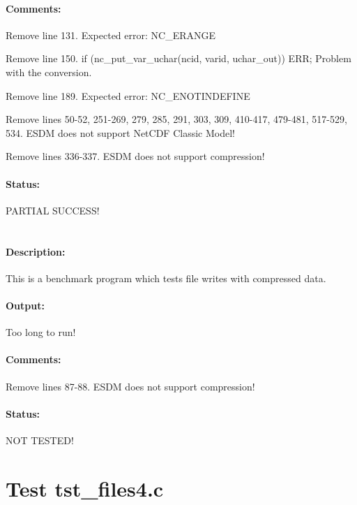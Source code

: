 \paragraph{Comments:} Remove line 131. Expected error: NC\_ERANGE

Remove line 150. if (nc\_put\_var\_uchar(ncid, varid, uchar\_out)) ERR; Problem with the conversion.

Remove line 189. Expected error: NC\_ENOTINDEFINE

Remove lines 50-52, 251-269, 279, 285, 291, 303, 309, 410-417, 479-481, 517-529, 534. ESDM does not support NetCDF Classic Model!

Remove lines 336-337. ESDM does not support compression!

\paragraph{Status:} PARTIAL SUCCESS!

{\color{blue}{Help, Julian!}}

\section{{\color{blue}{FIX ME! Test tst\_files3.c}}}

\paragraph{Description:} This is a benchmark program which tests file writes with compressed data.

\paragraph{Output:} Too long to run!

\paragraph{Comments:} Remove lines 87-88. ESDM does not support compression!

\paragraph{Status:} NOT TESTED!

\section{Test tst\_files4.c}

